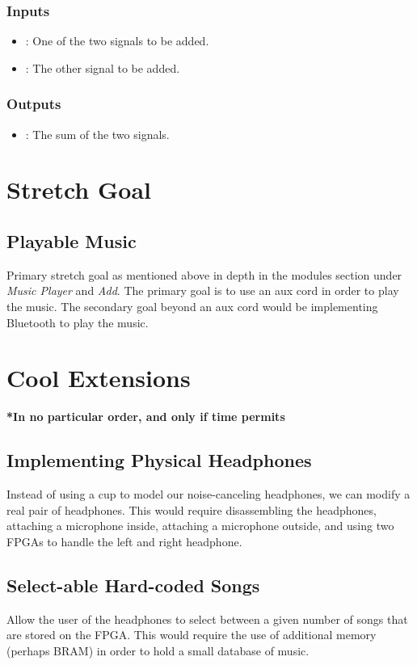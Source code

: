 \documentclass{fpgairpods}
\begin{document}
\begin{multicols*}{2}
\subsubsection{Inputs}
\begin{itemize}
    \item {}: One of the two signals to be added.
    \item {}: The other signal to be added.
\end{itemize}
\subsubsection{Outputs}
\begin{itemize}
    \item {}: The sum of the two signals.
\end{itemize}



\section{Stretch Goal}

\subsection{Playable Music}
Primary stretch goal as mentioned above in depth in the modules section under \textit{Music Player} and \textit{Add}. The primary goal is to use an aux cord in order to play the music. The secondary goal beyond an aux cord would be implementing Bluetooth to play the music. 

\section{Cool Extensions}
\textbf{*In no particular order, and only if time permits}

\subsection{Implementing Physical Headphones}
Instead of using a cup to model our noise-canceling headphones, we can modify a real pair of headphones. This would require disassembling the headphones, attaching a microphone inside, attaching a microphone outside, and using two FPGAs to handle the left and right headphone.

\subsection{Select-able Hard-coded Songs}
Allow the user of the headphones to select between a given number of songs that are stored on the FPGA. This would require the use of additional memory (perhaps BRAM) in order to hold a small database of music.



\end{multicols*}
\end{document}
